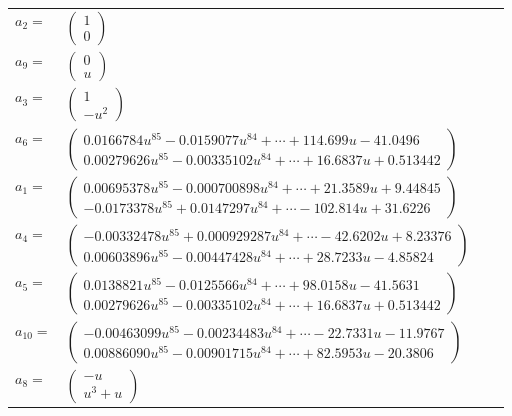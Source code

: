 \documentclass[1p]{elsarticle_modified}
\theoremstyle{definition}
\begin{document}
\begin{tabular}{m{7pt} m{180pt} m{7pt} m{180pt} }
\flushright $a_{2}=$&$\begin{pmatrix}1\\0\end{pmatrix}$ \\
\flushright $a_{9}=$&$\begin{pmatrix}0\\u\end{pmatrix}$ \\
\flushright $a_{3}=$&$\begin{pmatrix}1\\- u^2\end{pmatrix}$ \\
\flushright $a_{6}=$&$\begin{pmatrix}0.0166784 u^{85}-0.0159077 u^{84}+\cdots+114.699 u-41.0496\\0.00279626 u^{85}-0.00335102 u^{84}+\cdots+16.6837 u+0.513442\end{pmatrix}$ \\
\flushright $a_{1}=$&$\begin{pmatrix}0.00695378 u^{85}-0.000700898 u^{84}+\cdots+21.3589 u+9.44845\\-0.0173378 u^{85}+0.0147297 u^{84}+\cdots-102.814 u+31.6226\end{pmatrix}$ \\
\flushright $a_{4}=$&$\begin{pmatrix}-0.00332478 u^{85}+0.000929287 u^{84}+\cdots-42.6202 u+8.23376\\0.00603896 u^{85}-0.00447428 u^{84}+\cdots+28.7233 u-4.85824\end{pmatrix}$ \\
\flushright $a_{5}=$&$\begin{pmatrix}0.0138821 u^{85}-0.0125566 u^{84}+\cdots+98.0158 u-41.5631\\0.00279626 u^{85}-0.00335102 u^{84}+\cdots+16.6837 u+0.513442\end{pmatrix}$ \\
\flushright $a_{10}=$&$\begin{pmatrix}-0.00463099 u^{85}-0.00234483 u^{84}+\cdots-22.7331 u-11.9767\\0.00886090 u^{85}-0.00901715 u^{84}+\cdots+82.5953 u-20.3806\end{pmatrix}$ \\
\flushright $a_{8}=$&$\begin{pmatrix}- u\\u^3+u\end{pmatrix}$ \\

\end{tabular}
\end{document}
